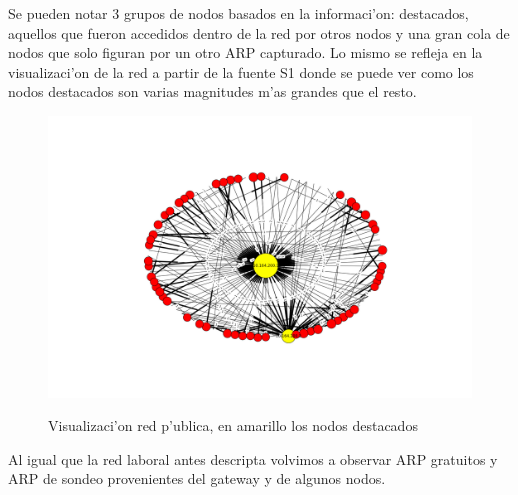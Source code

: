 Se pueden notar 3 grupos de nodos basados en la informaci'on: destacados, aquellos que fueron accedidos dentro de la red por otros nodos y una
gran cola de nodos que solo figuran por un otro ARP capturado. Lo mismo se refleja en la visualizaci'on de la red a partir de la fuente S1
donde se puede ver como los nodos destacados son varias magnitudes m'as grandes que el resto. 

\begin{figure}[!h]
\caption{Visualizaci'on red p'ublica, en amarillo los nodos destacados}
\includegraphics[width=1.1\textwidth]{red3_red}
 \label{fig:red3net}
\end{figure}

Al igual que la red laboral antes descripta volvimos a observar ARP gratuitos y ARP de sondeo provenientes del gateway y de algunos nodos.
